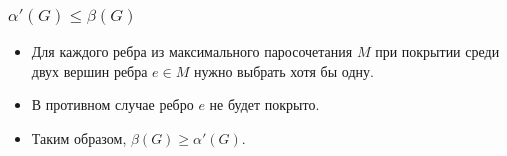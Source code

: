 \begin{frame}[t]
    \small
    \frametitle{$\alpha'(G) \leq \beta(G)$}

    \begin{itemize}
        \item Для каждого ребра из максимального паросочетания $M$ при покрытии среди двух вершин ребра $e \in M$ нужно выбрать хотя бы одну.
        \item В противном случае ребро $e$ не будет покрыто.
        \item Таким образом, $\beta(G) \geq \alpha' (G)$. 
    \end{itemize}
    \hfill \qedsymbol
\end{frame}

